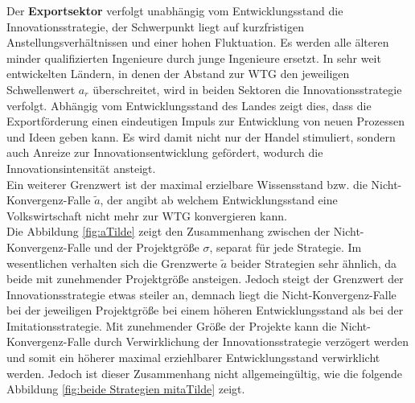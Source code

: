 Der \textbf{Exportsektor} verfolgt unabhängig vom Entwicklungsstand die \textcolor[rgb]{0.74,0.97,0.22}{Innovationsstrategie}, der Schwerpunkt liegt auf kurzfristigen Anstellungsverhältnissen und einer hohen Fluktuation. Es werden alle älteren minder qualifizierten Ingenieure durch junge Ingenieure ersetzt.
In sehr weit entwickelten Ländern, in denen der Abstand zur WTG den jeweiligen Schwellenwert $a_r$ überschreitet, wird in beiden Sektoren die \textcolor[rgb]{0.74,0.97,0.22}{Innovationsstrategie} verfolgt. Abhängig vom Entwicklungsstand des Landes zeigt dies, dass die Exportförderung einen eindeutigen Impuls zur Entwicklung von neuen Prozessen und Ideen geben kann. Es wird damit nicht nur der Handel stimuliert, sondern auch Anreize zur Innovationsentwicklung gefördert, wodurch die Innovationsintensität ansteigt. \\
Ein weiterer Grenzwert ist der maximal erzielbare Wissensstand bzw. die Nicht-Konvergenz-Falle $\tilde{a}$, der angibt ab welchem Entwicklungsstand eine Volkswirtschaft nicht mehr zur WTG konvergieren kann.\\




Die Abbildung \ref{fig:aTilde} zeigt den Zusammenhang zwischen der Nicht-Konvergenz-Falle und der Projektgrö{\ss}e $\sigma$, separat für jede Strategie. Im wesentlichen verhalten sich die Grenzwerte $\tilde{a}$ beider Strategien sehr ähnlich, da beide mit zunehmender Projektgrö{\ss}e ansteigen. Jedoch steigt der Grenzwert der \textcolor[rgb]{0.74,0.97,0.22}{Innovationsstrategie} etwas steiler an, demnach liegt die Nicht-Konvergenz-Falle bei der jeweiligen Projektgrö{\ss}e bei einem höheren Entwicklungsstand als bei der \textcolor[rgb]{0,0.32,0}{Imitationsstrategie}. Mit zunehmender Grö{\ss}e der Projekte kann die Nicht-Konvergenz-Falle durch Verwirklichung der \textcolor[rgb]{0.74,0.97,0.22}{Innovationsstrategie} verzögert werden und somit ein höherer maximal erziehlbarer Entwicklungsstand verwirklicht werden. Jedoch ist dieser Zusammenhang nicht allgemeingültig, wie die folgende Abbildung \ref{fig:beide Strategien mitaTilde} zeigt. \\


